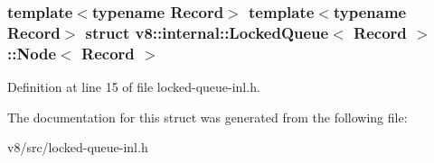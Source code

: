 \subsubsection*{template$<$typename Record$>$\newline
template$<$typename Record$>$\newline
struct v8\+::internal\+::\+Locked\+Queue$<$ Record $>$\+::\+Node$<$ Record $>$}



Definition at line 15 of file locked-\/queue-\/inl.\+h.



The documentation for this struct was generated from the following file\+:\begin{DoxyCompactItemize}
\item 
v8/src/locked-\/queue-\/inl.\+h\end{DoxyCompactItemize}
